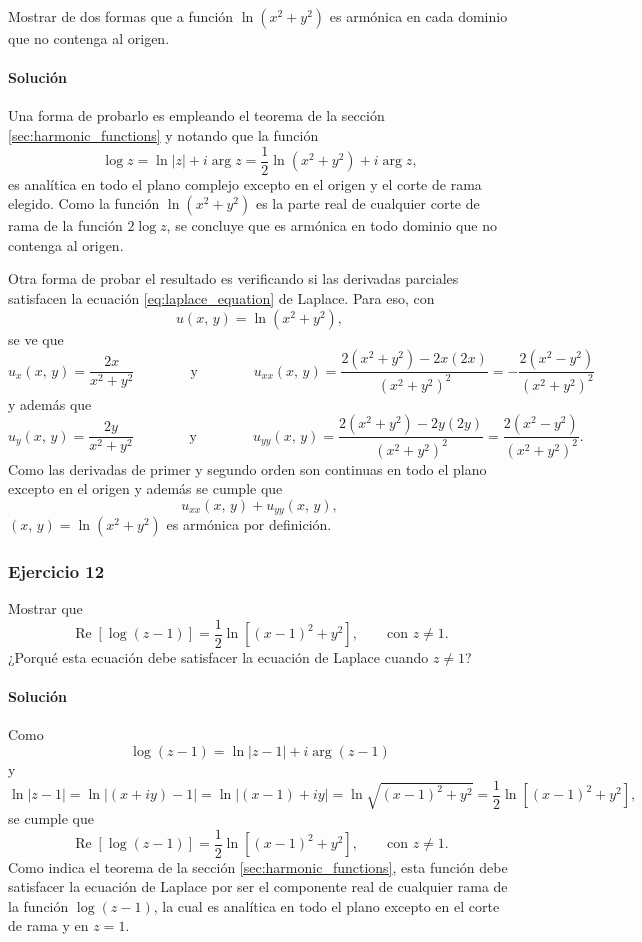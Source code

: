 \documentclass[a4paper]{report}
\renewcommand{\Re}{\operatorname{Re}}
\begin{document}
Mostrar de dos formas que a función \(\ln(x^2+y^2)\) es armónica en cada dominio que no contenga al origen.

\paragraph{Solución} Una forma de probarlo es empleando el teorema de la sección \ref{sec:harmonic_functions} y notando que la función
\[
 \log z=\ln|z|+i\arg z=\frac{1}{2}\ln(x^2+y^2)+i\arg z,
\]
es analítica en todo el plano complejo excepto en el origen y el corte de rama elegido. Como la función \(\ln(x^2+y^2)\) es la parte real de cualquier corte de rama de la función \(2\log z\), se concluye que es armónica en todo dominio que no contenga al origen. 

Otra forma de probar el resultado es verificando si las derivadas parciales satisfacen la ecuación \ref{eq:laplace_equation} de Laplace. Para eso, con 
\[
 u(x,\,y)=\ln(x^2+y^2),
\]
se ve que 
\[
 u_x(x,\,y)=\frac{2x}{x^2+y^2}
 \qquad\qquad\textrm{y}\qquad\qquad 
 u_{xx}(x,\,y)=\frac{2(x^2+y^2)-2x(2x)}{(x^2+y^2)^2}=-\frac{2(x^2-y^2)}{(x^2+y^2)^2}
\]
y además que 
\[
 u_y(x,\,y)=\frac{2y}{x^2+y^2}
 \qquad\qquad\textrm{y}\qquad\qquad 
 u_{yy}(x,\,y)=\frac{2(x^2+y^2)-2y(2y)}{(x^2+y^2)^2}=\frac{2(x^2-y^2)}{(x^2+y^2)^2}.
\]
Como las derivadas de primer y segundo orden son continuas en todo el plano excepto en el origen  y además se cumple que 
\[
 u_{xx}(x,\,y)+u_{yy}(x,\,y),
\]
\((x,\,y)=\ln(x^2+y^2)\) es armónica por definición.

\subsubsection{Ejercicio 12}

Mostrar que 
\[
 \Re[\log(z-1)]=\frac{1}{2}\ln[(x-1)^2+y^2],\qquad\textrm{con }z\neq1.
\]
¿Porqué esta ecuación debe satisfacer la ecuación de Laplace cuando \(z\neq1\)?

\paragraph{Solución} Como
\[
 \log(z-1)=\ln|z-1|+i\arg(z-1)
\]
y
\[
 \ln|z-1|=\ln|(x+iy)-1|=\ln|(x-1)+iy|=\ln\sqrt{(x-1)^2+y^2}=\frac{1}{2}\ln[(x-1)^2+y^2],
\]
se cumple que 
\[
 \Re[\log(z-1)]=\frac{1}{2}\ln[(x-1)^2+y^2],\qquad\textrm{con }z\neq1.
\]
Como indica el teorema de la sección \ref{sec:harmonic_functions}, esta función debe satisfacer la ecuación de Laplace por ser el componente real de cualquier rama de la función \(\log(z-1)\), la cual es analítica en todo el plano excepto en el corte de rama y en \(z=1\).
\end{document}
